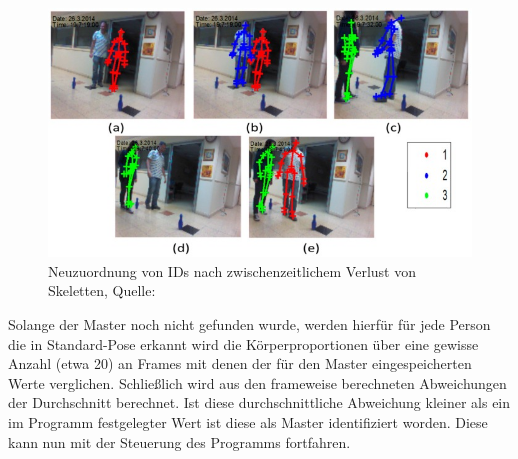  \begin{figure}
\includegraphics[width=\textwidth]{pictures/sensors-16-01965-g005.jpg}
\caption{Neuzuordnung von IDs nach zwischenzeitlichem \glqq Verlust\grqq{} von Skeletten, Quelle:\cite{bodyprop}}
\label{fig:fehlerk}
\end{figure}
 \par
 Solange der Master noch nicht gefunden wurde, werden hierfür für jede Person die in Standard-Pose erkannt wird die Körperproportionen über eine gewisse Anzahl (etwa 20) an Frames mit denen der für den Master eingespeicherten Werte verglichen. Schließlich wird aus den frameweise berechneten Abweichungen der Durchschnitt berechnet. Ist diese durchschnittliche Abweichung kleiner als ein im Programm festgelegter Wert ist diese als Master identifiziert worden. Diese kann nun mit der Steuerung des Programms fortfahren.
	
	